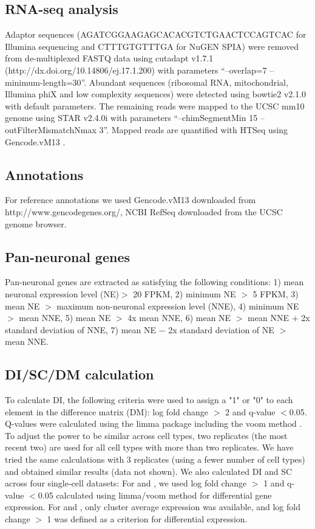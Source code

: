 \subsection{RNA-seq analysis}
Adaptor sequences (AGATCGGAAGAGCACACGTCTGAACTCCAGTCAC for Illumina sequencing and CTTTGTGTTTGA for NuGEN SPIA) were removed from de-multiplexed FASTQ data using cutadapt v1.7.1 (http://dx.doi.org/10.14806/ej.17.1.200) with parameters “--overlap=7 --minimum-length=30”. Abundant sequences (ribosomal RNA, mitochondrial, Illumina phiX and low complexity sequences) were detected using bowtie2 \citep{Langmead_2012} v2.1.0 with default parameters. The remaining reads were mapped to the UCSC mm10 genome using STAR \citep{Dobin_2012} v2.4.0i with parameters “--chimSegmentMin 15 --outFilterMismatchNmax 3”. Mapped reads are quantified with HTSeq \citep{Anders_2014} using Gencode.vM13 \citep{Harrow_2012}.

\subsection{Annotations}
For reference annotations we used Gencode.vM13 \citep{Harrow_2012} downloaded from http://www.gencodegenes.org/, NCBI RefSeq \citep{Pruitt_2013} downloaded from the UCSC genome browser.

\subsection{Pan-neuronal genes}
Pan-neuronal genes are extracted as satisfying the following conditions: 1) mean neuronal expression level (NE)$>$ 20 FPKM, 2) minimum NE $>$ 5 FPKM, 3) mean NE $>$ maximum non-neuronal expression level (NNE), 4) minimum NE $>$ mean NNE, 5) mean NE $>$ 4x mean NNE, 6) mean NE $>$ mean NNE $+$ 2x standard deviation of NNE, 7) mean NE $-$ 2x standard deviation of NE $>$ mean NNE. 

\subsection{DI/SC/DM calculation}
To calculate DI, the following criteria were used to assign a "1" or "0" to each element in the difference matrix (DM): log fold change $>$ 2 and q-value $<$0.05. Q-values were calculated using the limma package including the voom method \citep{Law_2014}. To adjust the power to be similar across cell types, two replicates (the most recent two) are used for all cell types with more than two replicates. We have tried the same calculations with 3 replicates (using a fewer number of cell types) and obtained similar results (data not shown).
We also calculated DI and SC across four single-cell datasets: For \cite{Zeisel_2015} and \cite{Tasic_2016}, we used log fold change $>$ 1 and q-value $<$0.05 calculated using limma/voom method for differential gene expression. For \cite{Saunders_2018} and \cite{Zeisel_2018}, only cluster average expression was available, and log fold change $>$ 1 was defined as a criterion for differential expression.


